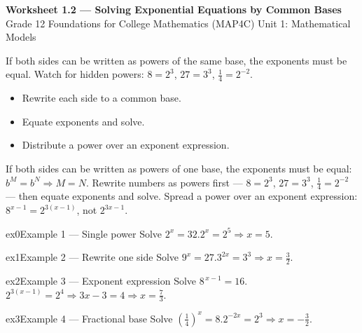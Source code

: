 \documentclass[11pt]{article}
\begin{document}
\begin{center}
{\LARGE\bfseries\color{titleblue}Worksheet 1.2 --- Solving Exponential Equations by Common Bases}\\[2pt]
{\small Grade 12 Foundations for College Mathematics (MAP4C) \textperiodcentered{} Unit 1: Mathematical Models}
\end{center}

\begin{ideabox}
If both sides can be written as powers of the same base, the exponents must be equal. Watch for hidden powers: $8=2^3$, $27=3^3$, $\tfrac14=2^{-2}$.
\begin{itemize}[leftmargin=*,itemsep=2pt]
  \item Rewrite each side to a common base.
  \item Equate exponents and solve.
  \item Distribute a power over an exponent expression.
\end{itemize}
\end{ideabox}

\begin{learnbox}
If both sides can be written as powers of one base, the exponents must be equal: $b^{M}=b^{N}\Rightarrow M=N$.
Rewrite numbers as powers first — $8=2^3$, $27=3^3$, $\tfrac14=2^{-2}$ — then equate exponents and solve.
Spread a power over an exponent expression: $8^{x-1}=2^{3(x-1)}$, not $2^{3x-1}$.
\end{learnbox}


\begin{example}{ex0}{Example 1 --- Single power}
Solve $2^{x}=32$.\soln $2^x=2^5\Rightarrow x=5$.
\end{example}

\begin{example}{ex1}{Example 2 --- Rewrite one side}
Solve $9^{x}=27$.\soln $3^{2x}=3^3\Rightarrow x=\tfrac32$.
\end{example}

\begin{example}{ex2}{Example 3 --- Exponent expression}
Solve $8^{\,x-1}=16$.\soln $2^{3(x-1)}=2^4\Rightarrow 3x-3=4\Rightarrow x=\tfrac73$.
\end{example}

\begin{example}{ex3}{Example 4 --- Fractional base}
Solve $\left(\tfrac14\right)^{x}=8$.\soln $2^{-2x}=2^3\Rightarrow x=-\tfrac32$.
\end{example}
\end{document}
